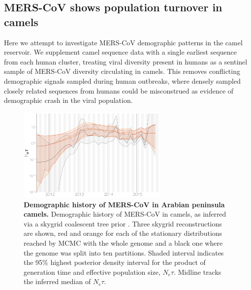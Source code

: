 \documentclass[9pt,lineno]{elife}
\begin{document}
%


\subsection*{MERS-CoV shows population turnover in camels}

Here we attempt to investigate MERS-CoV demographic patterns in the camel reservoir.
We supplement camel sequence data with a single earliest sequence from each human cluster, treating viral diversity present in humans as a sentinel sample of MERS-CoV diversity circulating in camels.
This removes conflicting demographic signals sampled during human outbreaks, where densely sampled closely related sequences from humans could be misconstrued as evidence of demographic crash in the viral population.

\begin{figure}[h]
\centering
	\includegraphics[width=0.65\textwidth]{figures/mers_skygrid.png}
	\caption{\textbf{Demographic history of MERS-CoV in Arabian peninsula camels.}
Demographic history of MERS-CoV in camels, as inferred via a skygrid coalescent tree prior \citep{gill_2013}.
Three skygrid reconstructions are shown, red and orange for each of the stationary distributions reached by MCMC with the whole genome and a black one where the genome was split into ten partitions.
Shaded interval indicates the 95\% highest posterior density interval for the product of generation time and effective population size, $N_{e}\tau$.
Midline tracks the inferred median of $N_{e}\tau$.
	}
	\label{skygrid}
\end{figure}
\end{document}
